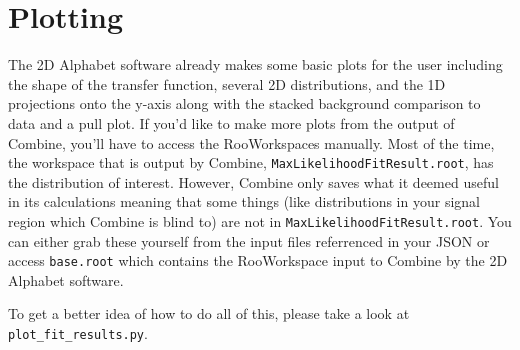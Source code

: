 \documentclass[letter]{article}
\begin{document}
\section{Plotting}
    The 2D Alphabet software already makes some basic plots for the user including the shape of the transfer function, several 2D distributions, and the 1D projections onto the y-axis along with the stacked background comparison to data and a pull plot. If you'd like to make more plots from the output of Combine, you'll have to access the RooWorkspaces manually. Most of the time, the workspace that is output by Combine, \verb"MaxLikelihoodFitResult.root", has the distribution of interest. However, Combine only saves what it deemed useful in its calculations meaning that some things (like distributions in your signal region which Combine is blind to) are not in \verb"MaxLikelihoodFitResult.root". You can either grab these yourself from the input files referrenced in your JSON or access \verb"base.root" which contains the RooWorkspace input to Combine by the 2D Alphabet software.

    To get a better idea of how to do all of this, please take a look at \verb"plot_fit_results.py".
\end{document}
